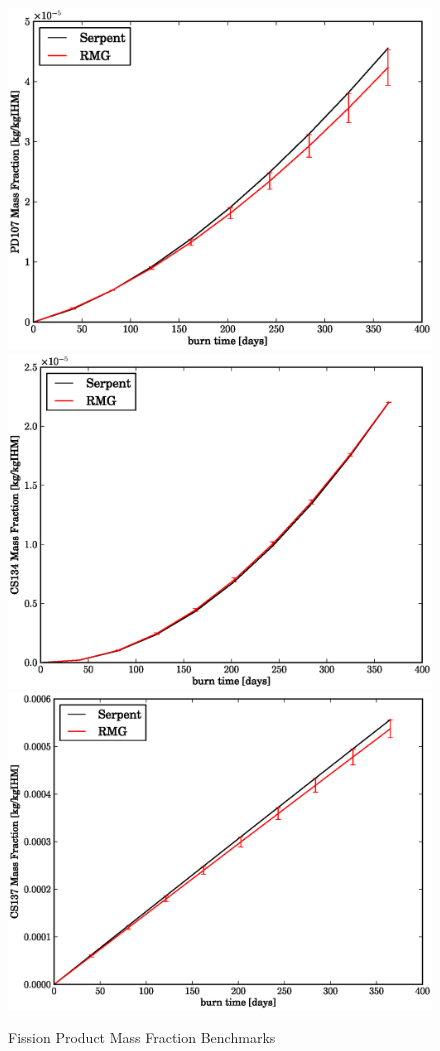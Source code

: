 \begin{figure}[htbp]
\caption{Fission Product Mass Fraction Benchmarks}
\label{fp_benchmark}
\begin{center}
\includegraphics[scale=0.3]{multigroup_method/figs/benchmark/PD107_Mass_Fraction_.eps}
\includegraphics[scale=0.3]{multigroup_method/figs/benchmark/CS134_Mass_Fraction_.eps}
\includegraphics[scale=0.3]{multigroup_method/figs/benchmark/CS137_Mass_Fraction_.eps}

\end{center}
\end{figure}
